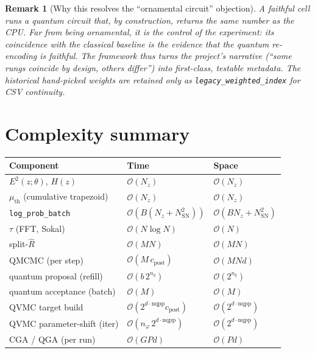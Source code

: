 \documentclass[11pt]{article}
\newtheorem{remark}{Remark}[section]
\newcommand{\Ezsq}{E^2(z;\theta)}
\newcommand{\code}[1]{\texttt{#1}}
\newcommand{\bigO}{\mathcal{O}}
\newcommand{\Rhat}{\hat{R}}
\begin{document}
\begin{remark}[Why this resolves the ``ornamental circuit'' objection]
A faithful cell runs a quantum circuit that, by construction, returns the same
number as the CPU. Far from being ornamental, it is the \emph{control} of the
experiment: its coincidence with the classical baseline is the evidence that
the quantum re-encoding is faithful. The framework thus turns the project's
narrative (``some rungs coincide by design, others differ'') into first-class,
testable metadata. The historical hand-picked weights are retained only as
\code{legacy\_weighted\_index} for CSV continuity.
\end{remark}

\section{Complexity summary}
\label{sec:complexity}

\begin{center}
\footnotesize
\begin{longtable}{@{}lll@{}}
\toprule
\textbf{Component} & \textbf{Time} & \textbf{Space}\\
\midrule
\endhead
$\Ezsq$, $H(z)$              & $\bigO(N_z)$ & $\bigO(N_z)$\\
$\mu_{\mathrm{th}}$ (cumulative trapezoid) & $\bigO(N_z)$ & $\bigO(N_z)$\\
\code{log\_prob\_batch}      & $\bigO(B(N_z+N_{\mathrm{SN}}^2))$ & $\bigO(BN_z+N_{\mathrm{SN}}^2)$\\
$\tau$ (FFT, Sokal)          & $\bigO(N\log N)$ & $\bigO(N)$\\
split-$\Rhat$                & $\bigO(MN)$ & $\bigO(MN)$\\
QMCMC (per step)             & $\bigO(M\,c_{\mathrm{post}})$ & $\bigO(MNd)$\\
quantum proposal (refill)    & $\bigO(b\,2^{n_q})$ & $\bigO(2^{n_q})$\\
quantum acceptance (batch)   & $\bigO(M)$ & $\bigO(M)$\\
QVMC target build            & $\bigO(2^{d\cdot\mathrm{nqpp}}c_{\mathrm{post}})$ & $\bigO(2^{d\cdot\mathrm{nqpp}})$\\
QVMC parameter-shift (iter)  & $\bigO(n_\varphi\,2^{d\cdot\mathrm{nqpp}})$ & $\bigO(2^{d\cdot\mathrm{nqpp}})$\\
CGA / QGA (per run)          & $\bigO(GPd)$ & $\bigO(Pd)$\\
\bottomrule
\end{longtable}
\end{center}
\end{document}
